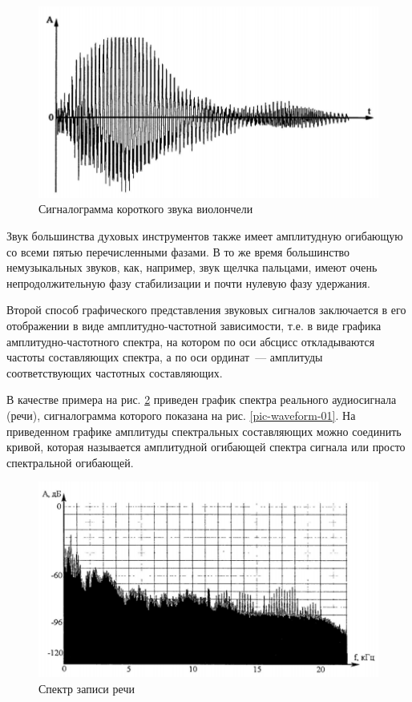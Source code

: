 \documentclass[oneside, final, 14pt]{extreport}
\begin{document}
\begin{figure}[h]
\centering
\includegraphics{pic-waveform-04}
\caption{Сигналограмма короткого звука виолончели}
\label{pic-waveform-04}
\end{figure}

Звук большинства духовых инструментов также имеет амплитудную огибающую со всеми пятью перечисленными фазами. В то же время большинство немузыкальных звуков, как, например, звук щелчка пальцами, имеют очень непродолжительную фазу стабилизации и почти нулевую фазу удержания.

Второй способ графического представления звуковых сигналов заключается в его отображении в виде амплитудно-частотной зависимости, т.е. в виде графика амплитудно-частотного спектра, на котором по оси абсцисс откладываются частоты составляющих спектра, а по оси ординат~--- амплитуды соответствующих частотных составляющих.

В качестве примера на рис. \ref{pic-specter-01} приведен график спектра реального аудиосигнала (речи), сигналограмма которого показана на рис. \ref{pic-waveform-01}. На приведенном графике амплитуды спектральных составляющих можно соединить кривой, которая называется амплитудной огибающей спектра сигнала или просто спектральной огибающей.

\begin{figure}[h]
\centering
\includegraphics{pic-specter-01}
\caption{Спектр записи речи}
\label{pic-specter-01}
\end{figure}
\end{document}
